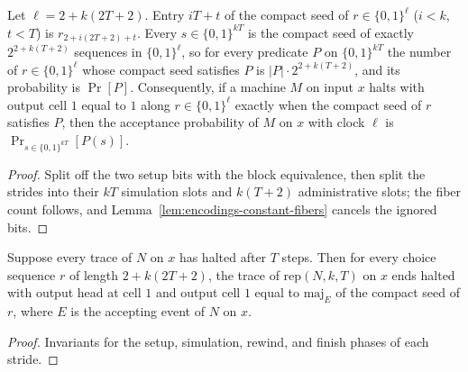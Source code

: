 \begin{lemma}
  \label{lem:encodings-repeat-seed}
  \leanok
  Let $\ell = 2 + k(2T + 2)$. Entry $iT + t$ of the compact seed of
  $r \in \{0,1\}^\ell$ ($i < k$, $t < T$) is $r_{2 + i(2T+2) + t}$. Every
  $s \in \{0,1\}^{kT}$ is the compact seed of exactly $2^{2 + k(T+2)}$
  sequences in $\{0,1\}^\ell$, so for every predicate $P$ on
  $\{0,1\}^{kT}$ the number of $r \in \{0,1\}^\ell$ whose compact seed
  satisfies $P$ is $|P| \cdot 2^{2 + k(T+2)}$, and its probability is
  $\Pr[P]$. Consequently, if a machine $M$ on input $x$ halts with output
  cell $1$ equal to $1$ along $r \in \{0,1\}^\ell$ exactly when the compact
  seed of $r$ satisfies $P$, then the acceptance probability of $M$ on $x$
  with clock $\ell$ is $\Pr_{s \in \{0,1\}^{kT}}[P(s)]$.
\end{lemma}
\begin{proof}
  \leanok
  Split off the two setup bits with the block equivalence, then split the
  strides into their $kT$ simulation slots and $k(T+2)$ administrative slots;
  the fiber count follows, and Lemma~\ref{lem:encodings-constant-fibers}
  cancels the ignored bits.
\end{proof}

\begin{theorem}
  \label{thm:encodings-repeat-correct}
  \leanok
  Suppose every trace of $N$ on $x$ has halted after $T$ steps. Then for every
  choice sequence $r$ of length $2 + k(2T + 2)$, the trace of
  $\mathrm{rep}(N, k, T)$ on $x$ ends halted with output head at cell $1$ and
  output cell $1$ equal to $\mathrm{maj}_E$ of the compact seed of $r$, where
  $E$ is the accepting event of $N$ on $x$.
\end{theorem}
\begin{proof}
  \leanok
  Invariants for the setup, simulation, rewind, and finish phases of each
  stride.
\end{proof}

